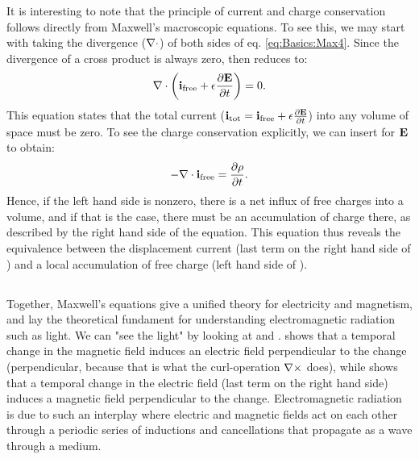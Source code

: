 It is interesting to note that the principle of current and charge conservation follows directly from Maxwell's macroscopic equations. To see this, we may start with taking the divergence (${\bf \nabla} \cdot$) of both sides of eq. \ref{eq:Basics:Max4}. Since the divergence of a cross product is always zero,  then reduces to:
\begin{equation}
{\bf \nabla} \cdot \left( {\bf i}_\text{free} +  \epsilon \frac{\partial {\bf E}}{\partial t} \right) = 0.
\label{eq:Basics:Max4dot}
\end{equation}
This equation states that the total current (${\bf i}_\text{tot} = {\bf i}_\text{free} +  \epsilon \frac{\partial {\bf E}}{\partial t}$) into any volume of space must be zero. To see the charge conservation explicitly, we can insert  for ${\bf E}$ to obtain:
\begin{equation}
- {\bf \nabla} \cdot {\bf i}_\text{free} =  \frac{\partial \rho}{\partial t}.
\label{eq:Basics:currentconservation}
\end{equation}
Hence, if the left hand side is nonzero, there is a net influx of free charges into a volume, and if that is the case, there must be an accumulation of charge there, as described by the right hand side of the equation. This equation thus reveals the equivalence between the displacement current (last term on the right hand side of )
  and a local accumulation of free charge (left hand side of ). 


\subsection{}
\label{sec:Basics:Quasistatic} 
Together, Maxwell's equations give a unified theory for electricity and magnetism, and lay the theoretical fundament for understanding electromagnetic radiation such as light. We can "see the light" by looking at  and .  shows that a temporal change in the magnetic field induces an electric field perpendicular to the change (perpendicular, because that is what the curl-operation ${\bf \nabla} \times$ does), while  shows that a temporal change in the electric field (last term on the right hand side) induces a magnetic field perpendicular to the change. Electromagnetic radiation is due to such an interplay where electric and magnetic fields act on each other through a periodic series of inductions and cancellations that propagate as a wave through a medium. 

